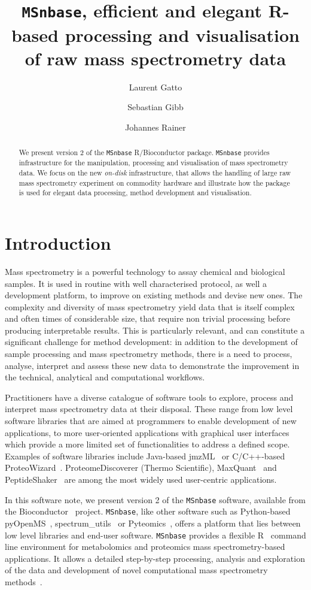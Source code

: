 \documentclass[journal=jacsat,manuscript=article]{achemso}\usepackage[]{graphicx}\usepackage[]{color}
\author{Laurent Gatto}
\affiliation[UCLouvain]{Computational Biology Unit, de Duve Institute, Universit\'e catholique de Louvain, Brussels, Belgium}
\author{Sebastian Gibb}
\affiliation[University of Greifswald]{Department of Anaesthesiology and Intensive Care of the University Medicine Greifswald, Germany}
\author{Johannes Rainer}
\affiliation[Eurac Research]{Institute for Biomedicine, Eurac Research, Affiliated Institute of the University of L\"ubeck, Bolzano, Italy}
\title[MSnbase version 2]
  {\texttt{MSnbase}, efficient and elegant R-based processing and
    visualisation of raw mass spectrometry data}
\begin{document}

\begin{abstract} %
  We present version 2 of the \texttt{MSnbase} R/Bioconductor
  package. \texttt{MSnbase} provides infrastructure for the
  manipulation, processing and visualisation of mass spectrometry
  data. We focus on the new \textit{on-disk} infrastructure, that
  allows the handling of large raw mass spectrometry experiment on
  commodity hardware and illustrate how the package is used for
  elegant data processing, method development and visualisation.
\end{abstract}



\section{Introduction}

Mass spectrometry is a powerful technology to assay chemical and
biological samples. It is used in routine with well characterised
protocol, as well a development platform, to improve on existing
methods and devise new ones. The complexity and diversity of mass
spectrometry yield data that is itself complex and often times of
considerable size, that require non trivial processing before
producing interpretable results. This is particularly relevant, and
can constitute a significant challenge for method development: in
addition to the development of sample processing and mass spectrometry
methods, there is a need to process, analyse, interpret and assess
these new data to demonstrate the improvement in the technical,
analytical and computational workflows.

Practitioners have a diverse catalogue of software tools to explore,
process and interpret mass spectrometry data at their disposal. These
range from low level software libraries that are aimed at programmers
to enable development of new applications, to more user-oriented
applications with graphical user interfaces which provide a more
limited set of functionalities to address a defined scope. Examples of
software libraries include Java-based jmzML~\cite{Cote:2010} or
C/C++-based ProteoWizard~\cite{Chambers:2012}. ProteomeDiscoverer
(Thermo Scientific), MaxQuant~\cite{Cox:2008} and
PeptideShaker~\cite{Vaudel:2015} are among the most widely used
user-centric applications.

In this software note, we present version 2 of the \texttt{MSnbase}
\cite{Gatto:2012} software, available from the
Bioconductor~\cite{Huber:2015} project. \texttt{MSnbase}, like other
software such as Python-based {pyOpenMS}~\cite{Rost:2014},
spectrum\_utils~\cite{Bittremieux:2020} or
Pyteomics~\cite{Goloborodko:2013}, offers a platform that lies between
low level libraries and end-user software. \texttt{MSnbase} provides a
flexible R~\cite{R} command line environment for metabolomics and
proteomics mass spectrometry-based applications. It allows a detailed
step-by-step processing, analysis and exploration of the data and
development of novel computational mass spectrometry
methods~\cite{Stanstrup:2019}.
\end{document}
